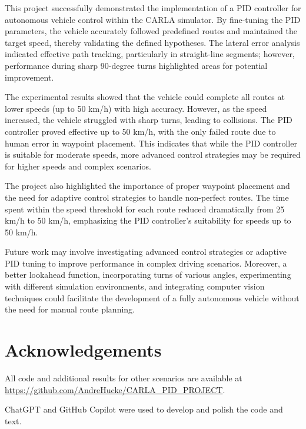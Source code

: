 \documentclass[conference]{IEEEtran}
\begin{document}
This project successfully demonstrated the implementation of a PID controller for autonomous vehicle control within the CARLA simulator. By fine-tuning the PID parameters, the vehicle accurately followed predefined routes and maintained the target speed, thereby validating the defined hypotheses. The lateral error analysis indicated effective path tracking, particularly in straight-line segments; however, performance during sharp 90-degree turns highlighted areas for potential improvement.

The experimental results showed that the vehicle could complete all routes at lower speeds (up to 50 km/h) with high accuracy. However, as the speed increased, the vehicle struggled with sharp turns, leading to collisions. The PID controller proved effective up to 50 km/h, with the only failed route due to human error in waypoint placement. This indicates that while the PID controller is suitable for moderate speeds, more advanced control strategies may be required for higher speeds and complex scenarios.

The project also highlighted the importance of proper waypoint placement and the need for adaptive control strategies to handle non-perfect routes. The time spent within the speed threshold for each route reduced dramatically from 25 km/h to 50 km/h, emphasizing the PID controller's suitability for speeds up to 50 km/h.

Future work may involve investigating advanced control strategies or adaptive PID tuning to improve performance in complex driving scenarios. Moreover, a better lookahead function, incorporating turns of various angles, experimenting with different simulation environments, and integrating computer vision techniques could facilitate the development of a fully autonomous vehicle without the need for manual route planning.

\section{Acknowledgements}

All code and additional results for other scenarios are available at \url{https://github.com/AndreHucke/CARLA_PID_PROJECT}.

ChatGPT and GitHub Copilot were used to develop and polish the code and text.



\end{document}
